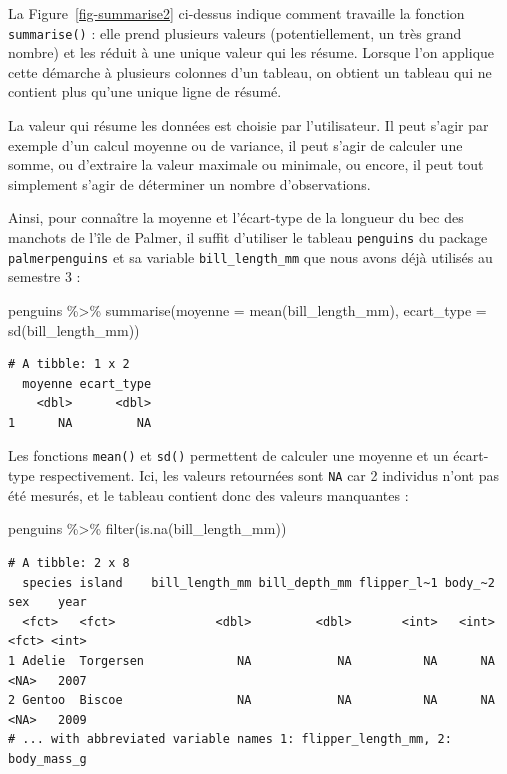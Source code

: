 \documentclass[
  a4paper,
  DIV=11,
  numbers=noendperiod,
  oneside]{scrreprt}
\newenvironment{Shaded}{}{}
\newcommand{\AttributeTok}[1]{\textcolor[rgb]{0.84,0.23,0.29}{#1}}
\newcommand{\FunctionTok}[1]{\textcolor[rgb]{0.44,0.26,0.76}{#1}}
\newcommand{\NormalTok}[1]{\textcolor[rgb]{0.14,0.16,0.18}{#1}}
\newcommand{\SpecialCharTok}[1]{\textcolor[rgb]{0.00,0.36,0.77}{#1}}
\begin{document}
La Figure~\ref{fig-summarise2} ci-dessus indique comment travaille la
fonction \texttt{summarise()} : elle prend plusieurs valeurs
(potentiellement, un très grand nombre) et les réduit à une unique
valeur qui les résume. Lorsque l'on applique cette démarche à plusieurs
colonnes d'un tableau, on obtient un tableau qui ne contient plus qu'une
unique ligne de résumé.

La valeur qui résume les données est choisie par l'utilisateur. Il peut
s'agir par exemple d'un calcul moyenne ou de variance, il peut s'agir de
calculer une somme, ou d'extraire la valeur maximale ou minimale, ou
encore, il peut tout simplement s'agir de déterminer un nombre
d'observations.

Ainsi, pour connaître la moyenne et l'écart-type de la longueur du bec
des manchots de l'île de Palmer, il suffit d'utiliser le tableau
\texttt{penguins} du package \texttt{palmerpenguins} et sa variable
\texttt{bill\_length\_mm} que nous avons déjà utilisés au semestre 3 :

\begin{Shaded}
\begin{Highlighting}[]
\NormalTok{penguins }\SpecialCharTok{\%\textgreater{}\%}
  \FunctionTok{summarise}\NormalTok{(}\AttributeTok{moyenne =} \FunctionTok{mean}\NormalTok{(bill\_length\_mm),}
            \AttributeTok{ecart\_type =} \FunctionTok{sd}\NormalTok{(bill\_length\_mm))}
\end{Highlighting}
\end{Shaded}

\begin{verbatim}
# A tibble: 1 x 2
  moyenne ecart_type
    <dbl>      <dbl>
1      NA         NA
\end{verbatim}

Les fonctions \texttt{mean()} et \texttt{sd()} permettent de calculer
une moyenne et un écart-type respectivement. Ici, les valeurs retournées
sont \texttt{NA} car 2 individus n'ont pas été mesurés, et le tableau
contient donc des valeurs manquantes :

\begin{Shaded}
\begin{Highlighting}[]
\NormalTok{penguins }\SpecialCharTok{\%\textgreater{}\%}
  \FunctionTok{filter}\NormalTok{(}\FunctionTok{is.na}\NormalTok{(bill\_length\_mm))}
\end{Highlighting}
\end{Shaded}

\begin{verbatim}
# A tibble: 2 x 8
  species island    bill_length_mm bill_depth_mm flipper_l~1 body_~2 sex    year
  <fct>   <fct>              <dbl>         <dbl>       <int>   <int> <fct> <int>
1 Adelie  Torgersen             NA            NA          NA      NA <NA>   2007
2 Gentoo  Biscoe                NA            NA          NA      NA <NA>   2009
# ... with abbreviated variable names 1: flipper_length_mm, 2: body_mass_g
\end{verbatim}
\end{document}
